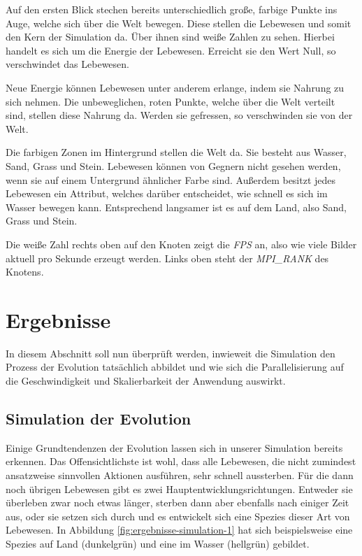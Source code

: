 \documentclass[course=erap]{aspdoc}
\begin{document}
Auf den ersten Blick stechen bereits unterschiedlich große, farbige Punkte ins Auge, welche sich über die Welt bewegen. Diese stellen die Lebewesen und somit den Kern der Simulation da. Über ihnen sind weiße Zahlen zu sehen. Hierbei handelt es sich um die Energie der Lebewesen. Erreicht sie den Wert Null, so verschwindet das Lebewesen.

Neue Energie können Lebewesen unter anderem erlange, indem sie Nahrung zu sich nehmen. Die unbeweglichen, roten Punkte, welche über die Welt verteilt sind, stellen diese Nahrung da. Werden sie gefressen, so verschwinden sie von der Welt.

Die farbigen Zonen im Hintergrund stellen die Welt da. Sie besteht aus Wasser, Sand, Grass und Stein. Lebewesen können von Gegnern nicht gesehen werden, wenn sie auf einem Untergrund ähnlicher Farbe sind. Außerdem besitzt jedes Lebewesen ein Attribut, welches darüber entscheidet, wie schnell es sich im Wasser bewegen kann. Entsprechend langsamer ist es auf dem Land, also Sand, Grass und Stein.

Die weiße Zahl rechts oben auf den Knoten zeigt die \emph{FPS} an, also wie viele Bilder aktuell pro Sekunde erzeugt werden. Links oben steht der \emph{MPI\_RANK} des Knotens.

\section{Ergebnisse}
In diesem Abschnitt soll nun überprüft werden, inwieweit die Simulation den Prozess der Evolution tatsächlich abbildet und wie sich die Parallelisierung auf die Geschwindigkeit und Skalierbarkeit der Anwendung auswirkt.

\subsection{Simulation der Evolution}
Einige Grundtendenzen der Evolution lassen sich in unserer Simulation bereits erkennen. Das Offensichtlichste ist wohl, dass alle Lebewesen, die nicht zumindest ansatzweise sinnvollen Aktionen ausführen, sehr schnell aussterben. Für die dann noch übrigen Lebewesen gibt es zwei Hauptentwicklungsrichtungen. Entweder sie überleben zwar noch etwas länger, sterben dann aber ebenfalls nach einiger Zeit aus, oder sie setzen sich durch und es entwickelt sich eine Spezies dieser Art von Lebewesen. In Abbildung \ref{fig:ergebnisse-simulation-1} hat sich beispielsweise eine Spezies auf Land (dunkelgrün) und eine im Wasser (hellgrün) gebildet.
\end{document}
